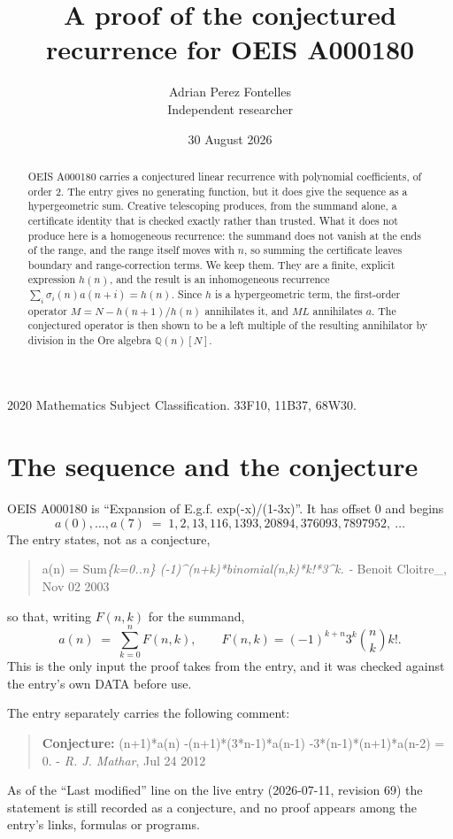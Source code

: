 \documentclass[11pt,a4paper]{article}
\title{A proof of the conjectured recurrence for OEIS A000180}
\author{Adrian Perez Fontelles\\ \small Independent researcher}
\date{30 August 2026}
\theoremstyle{plain}
\theoremstyle{definition}
\begin{document}
\maketitle

\begin{abstract}
OEIS A000180 carries a conjectured linear recurrence with polynomial coefficients, of
order 2. The entry gives no generating function, but it does give the sequence as
a hypergeometric sum. Creative telescoping produces, from the summand alone, a certificate
identity that is checked exactly rather than trusted. What it does not produce here is a
homogeneous recurrence: the summand does not vanish at the ends of the range, and the range
itself moves with $n$, so summing the certificate leaves boundary and range-correction
terms. We keep them. They are a finite, explicit expression $h(n)$, and the result is an
inhomogeneous recurrence $\sum_{i}\sigma_{i}(n)a(n+i)=h(n)$. Since $h$ is a hypergeometric term, the first-order operator $M=N-h(n+1)/h(n)$ annihilates it, and $ML$ annihilates $a$. The conjectured
operator is then shown to be a left multiple of the resulting annihilator by division in
the Ore algebra $\mathbb{Q}(n)[N]$.
\end{abstract}

\noindent\small 2020 Mathematics Subject Classification. 33F10, 11B37, 68W30.\normalsize

\section{The sequence and the conjecture}

OEIS A000180 is ``Expansion of E.g.f. exp(-x)/(1-3x)''. It has offset $0$ and begins
\[
a(0),\dots,a(7)\;=\;1, 2, 13, 116, 1393, 20894, 376093, 7897952,\ \dots
\]
The entry states, not as a conjecture,
\begin{quote}\small
a(n) = Sum\emph{\{k=0..n\} (-1)\textasciicircum{}(n+k)*binomial(n,k)*k!*3\textasciicircum{}k. - }Benoit Cloitre\_, Nov 02 2003
\end{quote}
so that, writing $F(n,k)$ for the summand,
\begin{equation}\label{eq:sum}
a(n)\;=\;\sum_{k=0}^{n}F(n,k),
\qquad F(n,k)=\left(-1\right)^{k + n} 3^{k} {\binom{n}{k}} k! .
\end{equation}
This is the only input the proof takes from the entry, and it was checked against the
entry's own DATA before use.

The entry separately carries the following comment:
\begin{quote}\small
\textbf{Conjecture:} (n+1)*a(n) -(n+1)*(3*n-1)*a(n-1) -3*(n-1)*(n+1)*a(n-2) = 0. - \emph{R. J. Mathar}, Jul 24 2012
\end{quote}
As of the ``Last modified'' line on the live entry (2026-07-11, revision 69) the
statement is still recorded as a conjecture, and no proof appears among the entry's links,
formulas or programs.
\end{document}
